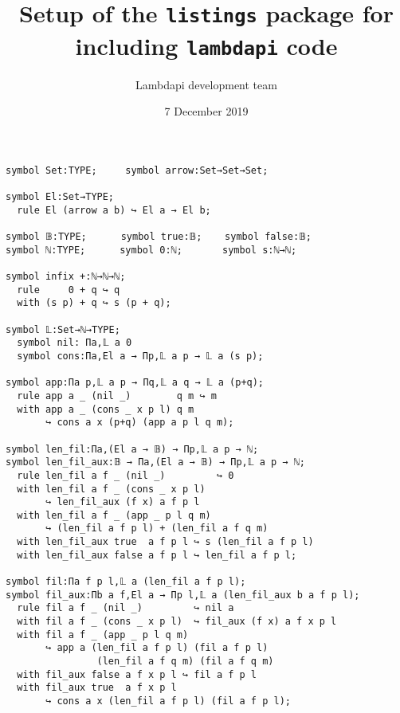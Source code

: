 \documentclass{article}
\title{Setup of the {\tt listings} package for including {\tt lambdapi} code}
\author{Lambdapi development team}
\date{7 December 2019}
\begin{document}
\maketitle

\small
\begin{lstlisting}
symbol Set:TYPE;     symbol arrow:Set→Set→Set;

symbol El:Set→TYPE;
  rule El (arrow a b) ↪ El a → El b;

symbol 𝔹:TYPE;      symbol true:𝔹;    symbol false:𝔹;
symbol ℕ:TYPE;      symbol 0:ℕ;       symbol s:ℕ→ℕ;

symbol infix +:ℕ→ℕ→ℕ;
  rule     0 + q ↪ q
  with (s p) + q ↪ s (p + q);

symbol 𝕃:Set→ℕ→TYPE;
  symbol nil: Πa,𝕃 a 0
  symbol cons:Πa,El a → Πp,𝕃 a p → 𝕃 a (s p);

symbol app:Πa p,𝕃 a p → Πq,𝕃 a q → 𝕃 a (p+q);
  rule app a _ (nil _)        q m ↪ m
  with app a _ (cons _ x p l) q m
       ↪ cons a x (p+q) (app a p l q m);

symbol len_fil:Πa,(El a → 𝔹) → Πp,𝕃 a p → ℕ;
symbol len_fil_aux:𝔹 → Πa,(El a → 𝔹) → Πp,𝕃 a p → ℕ;
  rule len_fil a f _ (nil _)         ↪ 0
  with len_fil a f _ (cons _ x p l)
       ↪ len_fil_aux (f x) a f p l
  with len_fil a f _ (app _ p l q m)
       ↪ (len_fil a f p l) + (len_fil a f q m)
  with len_fil_aux true  a f p l ↪ s (len_fil a f p l)
  with len_fil_aux false a f p l ↪ len_fil a f p l;

symbol fil:Πa f p l,𝕃 a (len_fil a f p l);
symbol fil_aux:Πb a f,El a → Πp l,𝕃 a (len_fil_aux b a f p l);
  rule fil a f _ (nil _)         ↪ nil a
  with fil a f _ (cons _ x p l)  ↪ fil_aux (f x) a f x p l
  with fil a f _ (app _ p l q m)
       ↪ app a (len_fil a f p l) (fil a f p l)
                (len_fil a f q m) (fil a f q m)
  with fil_aux false a f x p l ↪ fil a f p l
  with fil_aux true  a f x p l
       ↪ cons a x (len_fil a f p l) (fil a f p l);
\end{lstlisting}
\end{document}
